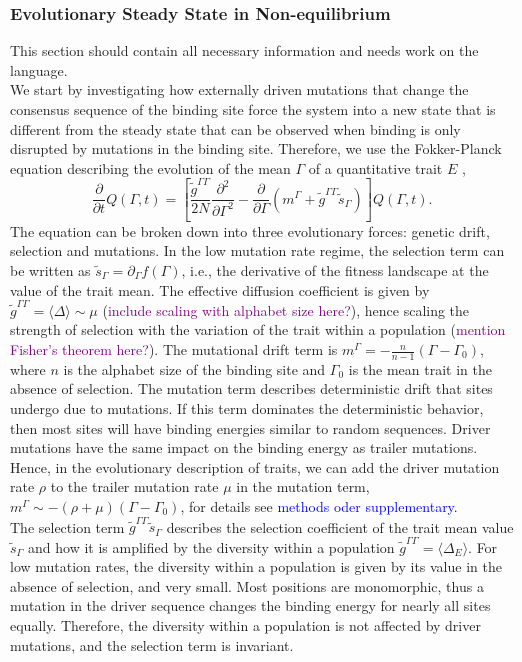 \documentclass[10pt,a4paper]{article}
\newcommand{\purple}[1]{\textcolor{purple}{#1}}
\begin{document}
	\subsubsection*{Evolutionary Steady State in Non-equilibrium}
	{\color{ForestGreen} This section should contain all necessary information and needs work on the language.}\\
	We start by investigating how externally driven mutations that change the consensus sequence of the binding site force the system into a new state that is different from the steady state that can be observed when binding is only disrupted by mutations in the binding site. Therefore, we use the Fokker-Planck equation describing the evolution of the mean $\Gamma$ of a quantitative trait $E$ \cite{nourmohammad_evolution_2013},
	\begin{equation}
		\frac{\partial}{\partial t}Q(\Gamma,t)=\left[\frac{\tilde{g}^{\Gamma\Gamma}}{2N}\frac{\partial^2}{\partial\Gamma^2}- \frac{\partial}{\partial\Gamma}\left(m^\Gamma+\tilde{g}^{\Gamma\Gamma}\tilde{s}_\Gamma\right)\right]Q(\Gamma,t)\label{equ:trait_diffusion}.
	\end{equation}
	The equation can be broken down into three evolutionary forces: genetic drift, selection and mutations. In the low mutation rate regime, the selection term can be written as $\tilde{s}_\Gamma = \partial_\Gamma f(\Gamma)$, i.e., the derivative of the fitness landscape at the value of the trait mean. The effective diffusion coefficient is given by $\tilde g^{\Gamma\Gamma} = \langle \Delta\rangle \sim \mu$ (\purple{include scaling with alphabet size here?}), hence scaling the strength of selection with the variation of the trait within a population (\purple{mention Fisher's theorem here?}). 
	The mutational drift term is $m^\Gamma = -\frac{n}{n-1} (\Gamma-\Gamma_0)$, where $n$ is the alphabet size of the binding site and $\Gamma_0$ is the mean trait in the absence of selection. 
	The mutation term describes deterministic drift that sites undergo due to mutations. If this term dominates the deterministic behavior, then most sites will have binding energies similar to random sequences. Driver mutations have the same impact on the binding energy as trailer mutations. Hence, in the evolutionary description of traits, we can add the driver mutation rate $\rho$ to the trailer mutation rate $\mu$ in the mutation term, $m^\Gamma\sim-(\rho+\mu)(\Gamma-\Gamma_0)$, for details see \textcolor{blue}{methods oder supplementary}.\\
	The selection term $\tilde{g}^{\Gamma\Gamma}\tilde{s}_\Gamma$ describes the selection coefficient of the trait mean value $\tilde{s}_\Gamma$ and how it is amplified by the diversity within a population $\tilde{g}^{\Gamma\Gamma}=\langle\Delta_E\rangle $. For low mutation rates, the diversity within a population is given by its value in the absence of selection, and very small. Most positions are monomorphic, thus a mutation in the driver sequence changes the binding energy for nearly all sites equally. Therefore, the diversity within a population is not affected by driver mutations, and the selection term is invariant.\\
\end{document}
